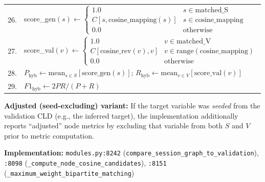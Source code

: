 \begin{table}[H]
\begin{tabular}{@{}r l@{}}
26. & score\_gen$(s) \leftarrow \begin{cases}1.0 & s \in \text{matched\_S}\\ C[s, \text{cosine\_mapping}(s)] & s \in \text{cosine\_mapping}\\ 0.0 & \text{otherwise}\end{cases}$ \\
27. & score\_val$(v) \leftarrow \begin{cases}1.0 & v \in \text{matched\_V}\\ C[\text{cosine\_rev}(v), v] & v \in \text{range}(\text{cosine\_mapping})\\ 0.0 & \text{otherwise}\end{cases}$ \\
28. & $P_{\mathrm{hyb}} \leftarrow \mathrm{mean}_{s\in S}[\mathrm{score\_gen}(s)]$; $R_{\mathrm{hyb}} \leftarrow \mathrm{mean}_{v\in V}[\mathrm{score\_val}(v)]$ \\
29. & $F1_{\mathrm{hyb}} \leftarrow 2PR/(P+R)$ \\
\bottomrule
\end{tabular}
\end{table}

\noindent\textbf{Adjusted (seed-excluding) variant:} If the target variable was \textit{seeded} from the validation CLD (e.g., the inferred target), the implementation additionally reports ``adjusted'' node metrics by excluding that variable from both $S$ and $V$ prior to metric computation.

\noindent\textbf{Implementation:} \texttt{modules.py:8242} (\texttt{compare\_session\_graph\_to\_validation}), \texttt{:8098} (\texttt{\_compute\_node\_cosine\_candidates}), \texttt{:8151} (\texttt{\_maximum\_weight\_bipartite\_matching})


